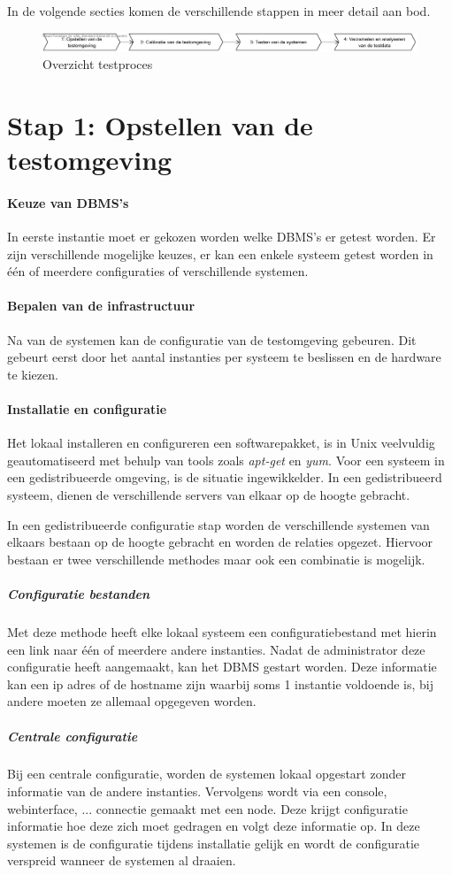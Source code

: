 In de volgende secties komen de verschillende stappen in meer detail aan bod.  
\begin{figure}[ht!]
\centering
\includegraphics[width=\linewidth]{img/Test-Process-Overview}
\caption{Overzicht testproces}
\label{fig:test-process-overview}
\end{figure}

\section{Stap 1: Opstellen van de testomgeving}
\paragraph{Keuze van DBMS's} In eerste instantie moet er gekozen worden welke DBMS's er getest worden. Er zijn verschillende mogelijke keuzes, er kan een enkele systeem getest worden in één of meerdere configuraties of verschillende systemen. 

\paragraph{Bepalen van de infrastructuur}Na van de systemen kan de configuratie van de testomgeving gebeuren. Dit gebeurt eerst door het aantal instanties per systeem te beslissen en de hardware te kiezen. 

\paragraph{Installatie en configuratie} Het lokaal installeren en configureren een softwarepakket, is in Unix veelvuldig geautomatiseerd met behulp van tools zoals \textit{apt-get} en \textit{yum}. Voor een systeem in een gedistribueerde omgeving, is de situatie ingewikkelder. In een gedistribueerd systeem, dienen de verschillende servers van elkaar op de hoogte gebracht.

In een gedistribueerde configuratie stap worden de verschillende systemen van elkaars bestaan op de hoogte gebracht en worden de relaties opgezet. Hiervoor bestaan er twee verschillende methodes maar ook een combinatie is mogelijk.
 
\subparagraph{Configuratie bestanden} Met deze methode heeft elke lokaal systeem een configuratiebestand met hierin een link naar één of meerdere andere instanties. Nadat de administrator deze configuratie heeft aangemaakt, kan het DBMS gestart worden. Deze informatie kan een ip adres of de hostname zijn waarbij soms 1 instantie voldoende is, bij andere moeten ze allemaal opgegeven worden. 
\subparagraph{Centrale configuratie} Bij een centrale configuratie, worden de systemen lokaal opgestart zonder informatie van de andere instanties. Vervolgens wordt via een console, webinterface, ... connectie gemaakt met een node. Deze krijgt configuratie informatie hoe deze zich moet gedragen en volgt deze informatie op. In deze systemen is de configuratie tijdens installatie gelijk en wordt de configuratie verspreid wanneer de systemen al draaien.  

